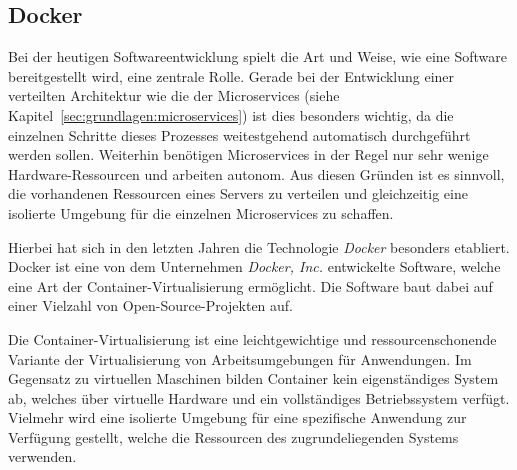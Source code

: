 \subsection{Docker}
\label{sec:grundlagen:docker}
Bei der heutigen Softwareentwicklung spielt die Art und Weise, wie eine Software bereitgestellt wird, eine zentrale Rolle.
Gerade bei der Entwicklung einer verteilten Architektur wie die der Microservices (siehe Kapitel~\ref{sec:grundlagen:microservices}) ist dies besonders wichtig, da die einzelnen Schritte dieses Prozesses weitestgehend automatisch durchgeführt werden sollen.
Weiterhin benötigen Microservices in der Regel nur sehr wenige Hardware-Ressourcen und arbeiten autonom.
Aus diesen Gründen ist es sinnvoll, die vorhandenen Ressourcen eines Servers zu verteilen und gleichzeitig eine isolierte Umgebung für die einzelnen Microservices zu schaffen.

Hierbei hat sich in den letzten Jahren die Technologie \emph{Docker} besonders etabliert.
Docker ist eine von dem Unternehmen \emph{Docker, Inc.} entwickelte Software, welche eine Art der Container-Virtualisierung ermöglicht.
Die Software baut dabei auf einer Vielzahl von Open-Source-Projekten auf.

Die Container-Virtualisierung ist eine leichtgewichtige und ressourcenschonende Variante der Virtualisierung von Arbeitsumgebungen für Anwendungen.
Im Gegensatz zu virtuellen Maschinen bilden Container kein eigenständiges System ab, welches über virtuelle Hardware und ein vollständiges Betriebssystem verfügt.
Vielmehr wird eine isolierte Umgebung für eine spezifische Anwendung zur Verfügung gestellt, welche die Ressourcen des zugrundeliegenden Systems verwenden.

